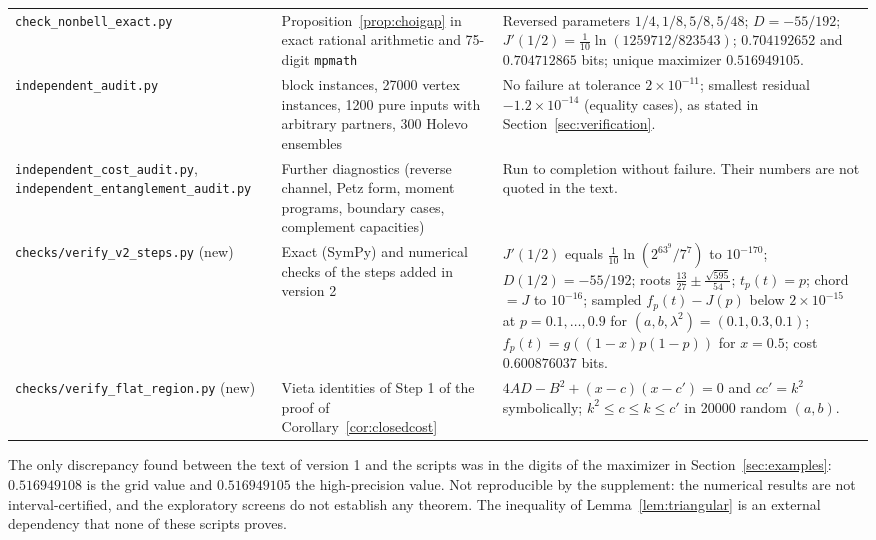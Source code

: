 \documentclass[11pt]{article}
\begin{document}
\begin{tabular}{@{}>{\raggedright\arraybackslash}p{3.1cm}>{\raggedright\arraybackslash}p{5.0cm}>{\raggedright\arraybackslash}p{7.3cm}@{}}
\texttt{check\_nonbell\_\allowbreak exact.py}&Proposition~\ref{prop:choigap} in exact rational arithmetic and 75-digit \texttt{mpmath}&Reversed parameters $1/4,1/8,5/8,5/48$; $D=-55/192$; $J'(1/2)=\tfrac1{10}\ln(1259712/823543)$; $0.704192652$ and $0.704712865$ bits; unique maximizer $0.516949105$.\\
\texttt{independent\_\allowbreak audit.py}&9000 block instances, 27000 vertex instances, 1200 pure inputs with arbitrary partners, 300 Holevo ensembles&No failure at tolerance $2\times10^{-11}$; smallest residual $-1.2\times10^{-14}$ (equality cases), as stated in Section~\ref{sec:verification}.\\
\texttt{independent\_\allowbreak cost\_audit.py}, \texttt{independent\_\allowbreak entanglement\_\allowbreak audit.py}&Further diagnostics (reverse channel, Petz form, moment programs, boundary cases, complement capacities)&Run to completion without failure. Their numbers are not quoted in the text.\\
\texttt{checks/verify\_\allowbreak v2\_steps.py} (new)&Exact (SymPy) and numerical checks of the steps added in version 2&$J'(1/2)$ equals $\tfrac1{10}\ln(2^63^9/7^7)$ to $10^{-170}$; $D(1/2)=-55/192$; roots $\tfrac{13}{27}\pm\tfrac{\sqrt{595}}{54}$; $t_p(t)=p$; chord $=J$ to $10^{-16}$; sampled $f_p(t)-J(p)$ below $2\times10^{-15}$ at $p=0.1,\dots,0.9$ for $(a,b,\lambda^2)=(0.1,0.3,0.1)$; $f_p(t)=g((1-x)p(1-p))$ for $x=0.5$; cost $0.600876037$ bits.\\
\texttt{checks/verify\_\allowbreak flat\_region.py} (new)&Vieta identities of Step 1 of the proof of Corollary~\ref{cor:closedcost}&$4AD-B^2+(x-c)(x-c')=0$ and $cc'=k^2$ symbolically; $k^2\le c\le k\le c'$ in 20000 random $(a,b)$.\\
\bottomrule
\end{tabular}
\endgroup

\medskip
\noindent The only discrepancy found between the text of version 1 and the scripts was in the digits of the maximizer in Section~\ref{sec:examples}: $0.516949108$ is the grid value and $0.516949105$ the high-precision value. Not reproducible by the supplement: the numerical results are not interval-certified, and the exploratory screens do not establish any theorem. The inequality of Lemma~\ref{lem:triangular} is an external dependency that none of these scripts proves.
\end{document}
